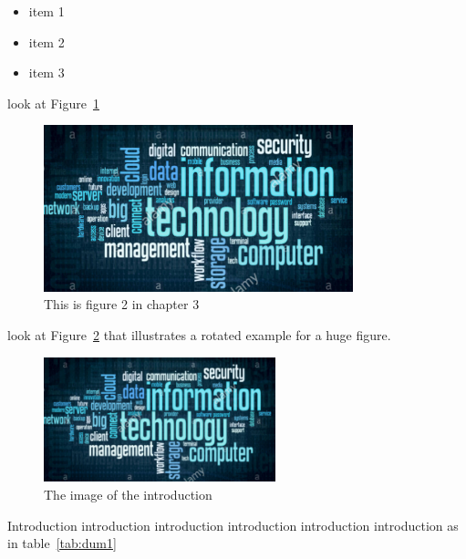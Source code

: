\begin{itemize}[noitemsep,topsep=0pt,parsep=0pt,partopsep=0pt]
\item item 1
\item item 2
\item item 3
\end{itemize}

look at Figure~\ref{fig11}

\begin{figure}[ht]
\begin{center}
\includegraphics[width=0.8\textwidth]{figures/samples/it.png}
\caption{This is figure 2 in chapter 3}
\label{fig11}
\end{center}
\end{figure}

look at Figure~\ref{fig12} that illustrates a rotated example for a huge figure.

\begin{figure}
\begin{center}
\includegraphics[width=0.6\textwidth]{figures/samples/it.png}
\caption{The image of the introduction}
\label{fig12}
\end{center}
\end{figure}



Introduction introduction introduction introduction introduction introduction as in table~\ref{tab:dum1}


